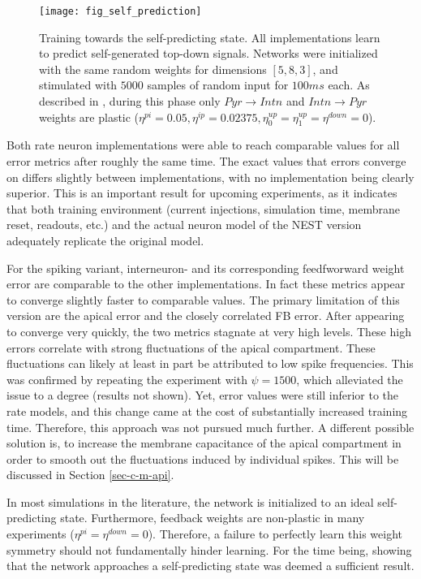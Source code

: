 \begin{figure}[h]
    \centering
    \texttt{[image: fig\_self\_prediction]}
    \caption[Training towards the self-predicting state]{Training towards the self-predicting state. All implementations
        learn to predict self-generated top-down signals. Networks were initialized with the same random weights for
        dimensions $[5, 8, 3]$, and stimulated with $5000$ samples of random input for $100ms$ each. As described in
        \citep{sacramento2018dendritic}, during this phase only $Pyr \rightarrow Intn$ and $Intn \rightarrow Pyr$
        weights are plastic ($\eta^{pi}=0.05, \eta^{ip}=0.02375, \eta^{up}_0=\eta^{up}_1=\eta^{down}=0$).}
    \label{fig-self-pred}
\end{figure}

Both rate neuron implementations were able to reach comparable values for all error metrics after roughly the same time.
The exact values that errors converge on differs slightly between implementations, with no implementation being clearly
superior. This is an important result for upcoming experiments, as it indicates that both training environment (current
injections, simulation time, membrane reset, readouts, etc.) and the actual neuron model of the NEST version adequately
replicate the original model.

For the spiking variant, interneuron- and its corresponding feedfworward weight error are comparable to the other
implementations. In fact these metrics appear to converge slightly faster to comparable values. The primary limitation
of this version are the apical error and the closely correlated FB error. After appearing to converge very quickly, the
two metrics stagnate at very high levels. These high errors correlate with strong fluctuations of the apical
compartment. These fluctuations can likely at least in part be attributed to low spike frequencies. This was confirmed
by repeating the experiment with $\psi=1500$, which alleviated the issue to a degree (results not shown). Yet, error
values were still inferior to the rate models, and this change came at the cost of substantially increased training
time. Therefore, this approach was not pursued much further. A different possible solution is, to increase the membrane
capacitance of the apical compartment in order to smooth out the fluctuations induced by individual spikes. This will be
discussed in Section \ref{sec-c-m-api}.

In most simulations in the literature, the network is initialized to an ideal self-predicting state. Furthermore,
feedback weights are non-plastic in many experiments ($\eta^{pi}=\eta^{down}=0$). Therefore, a failure to perfectly
learn this weight symmetry should not fundamentally hinder learning. For the time being, showing that the network
approaches a self-predicting state was deemed a sufficient result.


